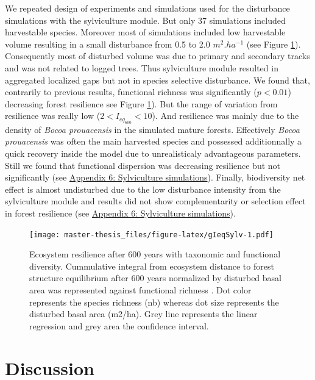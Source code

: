 \documentclass[12pt,]{article}
\let\oldsection\section
\renewcommand\section{\newpage\oldsection}
\theoremstyle{definition}
\theoremstyle{definition}
\theoremstyle{remark}
\begin{document}
We repeated design of experiments and simulations used for the
disturbance simulations with the sylviculture module. But only 37
simulations included harvestable species. Moreover most of simulations
included low harvestable volume resulting in a small disturbance from
0.5 to 2.0 \(m^2.ha^{-1}\) (see Figure \ref{fig:gIeqSylv}). Consequently
most of disturbed volume was due to primary and secondary tracks and was
not related to logged trees. Thus sylviculture module resulted in
aggregated localized gaps but not in species selective disturbance. We
found that, contrarily to previous results, functional richness was
significantly (\(p<0.01\)) decreasing forest resilience see Figure
\ref{fig:gIeqSylv}). But the range of variation from resilience was
really low (\(2 < I_{eq_{600}} < 10\)). And resilience was mainly due to
the density of \emph{Bocoa prouacensis} in the simulated mature forests.
Effectively \emph{Bocoa prouacensis} was often the main harvested
species and possessed additionnally a quick recovery inside the model
due to unrealisticaly advantageous parameters. Still we found that
functional dispersion was decreasing resilience but not significantly
(see \protect\hyperlink{appendix-6-sylviculture-simulations}{Appendix 6:
Sylviculture simulations}). Finally, biodiversity net effect is almost
undisturbed due to the low disturbance intensity from the sylviculture
module and results did not show complementarity or selection effect in
forest resilience (see
\protect\hyperlink{appendix-6-sylviculture-simulations}{Appendix 6:
Sylviculture simulations}).

\begin{figure}[htbp]
\centering
\texttt{[image: master-thesis\_files/figure-latex/gIeqSylv-1.pdf]}
\caption{\label{fig:gIeqSylv}Ecosystem resilience after 600 years with
taxonomic and functional diversity. Cummulative integral from ecosystem
distance to forest structure equilibrium after 600 years normalized by
disturbed basal area was represented against functional richness
\citep[FRic,][]{villeger_new_2008}. Dot color represents the species
richness (nb) whereas dot size represents the disturbed basal area
(m2/ha). Grey line represents the linear regression and grey area the
confidence interval.}
\end{figure}

\section{Discussion}\label{discussion}
\end{document}
